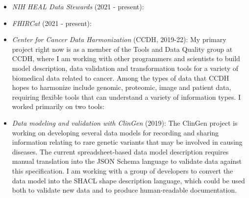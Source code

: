\begin{itemize}
\begin{products}


\end{products}

\item \textit{NIH HEAL Data Stewards} (2021 - present): 

\item \textit{FHIRCat} (2021 - present): 

\item \textit{Center for Cancer Data Harmonization} (CCDH, 2019-22): My primary project right now is as a member of the Tools and Data Quality group at CCDH, where I am working with other programmers and scientists to build model description, data validation and transformation tools for a variety of biomedical data related to cancer. Among the types of data that CCDH hopes to harmonize include genomic, proteomic, image and patient data, requiring flexible tools that can understand a variety of information types. I worked primarily on two tools:

\begin{products}



\end{products}

\item \textit{Data modeling and validation with ClinGen} (2019): The ClinGen project is working on developing several data models for recording and sharing information relating to rare genetic variants that may be involved in causing diseases. The current spreadsheet-based data model description requires manual translation into the JSON Schema language to validate data against this specification. I am working with a group of developers to convert the data model into the SHACL shape description language, which could be used both to validate new data and to produce human-readable documentation.


\end{itemize}
